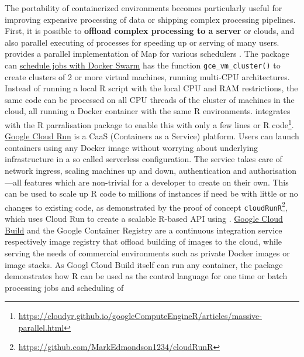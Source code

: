 \label{processing}

The portability of containerized environments becomes particularly
useful for improving expensive processing of data or shipping complex
processing pipelines. First, it is possible to \textbf{offload complex
processing to a server} or clouds, and also parallel executing of
processes for speeding up or serving of many users.
\textbf{} provides a parallel implementation of Map
for various schedulers \citep{Lang2017batchtools}. The package can
\href{https://mllg.github.io/batchtools/reference/makeClusterFunctionsDocker.html}{schedule
jobs with Docker Swarm} \textbf{} has the
function \texttt{gce\_vm\_cluster()} to create clusters of 2 or more
virtual machines, running multi-CPU architectures. Instead of running a
local R script with the local CPU and RAM restrictions, the same code
can be processed on all CPU threads of the cluster of machines in the
cloud, all running a Docker container with the same R environments.
 integrates with the R parralisation
package  to enable this with only a few lines or R
code\footnote{\href{https://cloudyr.github.io/googleComputeEngineR/articles/massive-parallel.html}{https://cloudyr.github.io/googleComputeEngineR/articles/massive-parallel.html}}.
\href{https://cloud.run}{Google Cloud Run} is a CaaS (Containers as a
Service) platform. Users can launch containers using any Docker image
without worrying about underlying infrastructure in a so called
serverless configuration. The service takes care of network ingress,
scaling machines up and down, authentication and authorisation---all
features which are non-trivial for a developer to create on their own.
This can be used to scale up R code to millions of instances if need be
with little or no changes to existing code, as demonstrated by the proof
of concept
\texttt{cloudRunR}\footnote{\href{https://github.com/MarkEdmondson1234/cloudRunR}{https://github.com/MarkEdmondson1234/cloudRunR}},
which uses Cloud Run to create a scalable R-based API using
. \href{https://cloud.google.com/cloud-build/}{Google
Cloud Build} and the Google Container Registry are a continuous
integration service respectively image registry that offload building of
images to the cloud, while serving the needs of commercial environments
such as private Docker images or image stacks. As Googl Cloud Build
itself can run any container, the package 
demonstrates how R can be used as the control language for one time or
batch processing jobs and scheduling of
